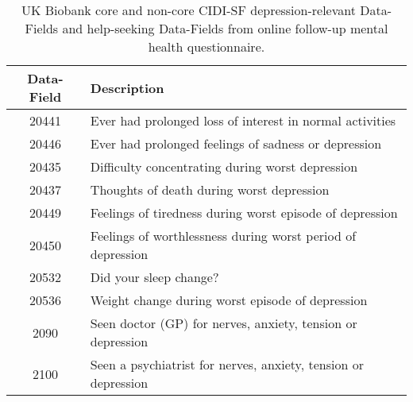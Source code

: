 \begin{table*}[t]
\begin{center}
  \small
  \begin{tabular}{ c | l }
    \toprule
    \textbf{Data-Field} & \textbf{Description} \\
    \midrule
    20441               & Ever had prolonged loss of interest in normal activities    \\
    20446               & Ever had prolonged feelings of sadness or depression        \\
    \midrule
    20435               & Difficulty concentrating during worst depression            \\
    20437               & Thoughts of death during worst depression                   \\
    20449               & Feelings of tiredness during worst episode of depression    \\
    20450               & Feelings of worthlessness during worst period of depression \\
    20532               & Did your sleep change?                                      \\
    20536               & Weight change during worst episode of depression            \\
    \midrule
    2090                & Seen doctor (GP) for nerves, anxiety, tension or depression  \\
    2100                & Seen a psychiatrist for nerves, anxiety, tension or depression \\
    \bottomrule
  \end{tabular}
  \caption{
    UK Biobank core and non-core CIDI-SF depression-relevant Data-Fields and help-seeking Data-Fields from online follow-up mental health questionnaire.
  }
  \label{tab:CIDI-SF-Data-Fields}
\end{center}
\end{table*}


